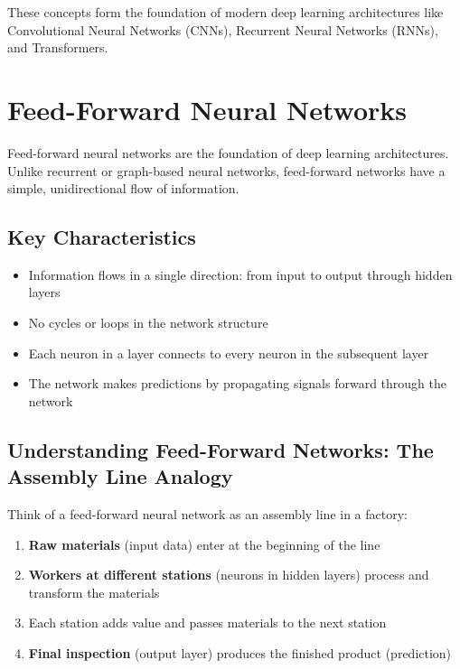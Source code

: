 \documentclass[
  letterpaper,
  DIV=11,
  numbers=noendperiod]{scrreprt}
\providecommand{\tightlist}{%
  \setlength{\itemsep}{0pt}\setlength{\parskip}{0pt}}\usepackage{longtable,booktabs,array}
\begin{document}
These concepts form the foundation of modern deep learning architectures
like Convolutional Neural Networks (CNNs), Recurrent Neural Networks
(RNNs), and Transformers.

\section{Feed-Forward Neural
Networks}\label{feed-forward-neural-networks}

Feed-forward neural networks are the foundation of deep learning
architectures. Unlike recurrent or graph-based neural networks,
feed-forward networks have a simple, unidirectional flow of information.

\subsection{Key Characteristics}\label{key-characteristics}

\begin{itemize}
\tightlist
\item
  Information flows in a single direction: from input to output through
  hidden layers
\item
  No cycles or loops in the network structure
\item
  Each neuron in a layer connects to every neuron in the subsequent
  layer
\item
  The network makes predictions by propagating signals forward through
  the network
\end{itemize}

\subsection{Understanding Feed-Forward Networks: The Assembly Line
Analogy}\label{understanding-feed-forward-networks-the-assembly-line-analogy}

Think of a feed-forward neural network as an assembly line in a factory:

\begin{enumerate}
\def\labelenumi{\arabic{enumi}.}
\tightlist
\item
  \textbf{Raw materials} (input data) enter at the beginning of the line
\item
  \textbf{Workers at different stations} (neurons in hidden layers)
  process and transform the materials
\item
  Each station adds value and passes materials to the next station
\item
  \textbf{Final inspection} (output layer) produces the finished product
  (prediction)
\end{enumerate}
\end{document}
